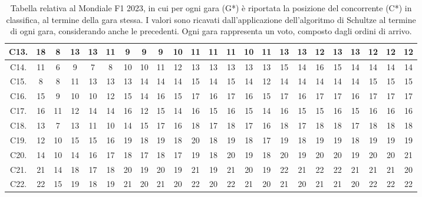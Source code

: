 \documentclass[12pt,a4paper,openright,twoside]{book}
\begin{document}
\begin{table}[H]
{\begin{tabular}{|c|c|c|c|c|c|c|c|c|c|c|c|c|c|c|c|c|c|c|c|c|c|c|}
C13.  & 18 & 8 & 13 & 13 & 11 & 9 & 9 & 9 & 10 & 11 & 11 & 11 & 10 & 11 & 13 & 13 & 12 & 13 & 13 & 12 & 12 & 12 \\ \hline
C14.  & 11 & 6 & 9 & 7 & 8 & 10 & 10 & 11 & 12 & 13 & 13 & 13 & 13 & 13 & 15 & 14 & 16 & 15 & 14 & 14 & 14 & 14 \\ \hline
C15. & 8 & 8 & 11 & 13 & 13 & 13 & 14 & 14 & 14 & 15 & 14 & 15 & 14 & 12 & 14 & 14 & 14 & 14 & 14 & 15 & 15 & 15 \\ \hline
C16.  & 15 & 9 & 10 & 10 & 12 & 15 & 14 & 16 & 15 & 17 & 16 & 17 & 16 & 15 & 17 & 16 & 17 & 17 & 16 & 17 & 17 & 17 \\ \hline
C17.  & 16 & 11 & 12 & 14 & 14 & 16 & 12 & 15 & 14 & 16 & 15 & 16 & 15 & 14 & 16 & 15 & 15 & 16 & 15 & 16 & 16 & 16 \\ \hline
C18.  & 13 & 7 & 13 & 11 & 10 & 14 & 15 & 17 & 16 & 18 & 17 & 18 & 17 & 16 & 18 & 17 & 18 & 18 & 17 & 18 & 18 & 18 \\ \hline
C19.  & 12 & 10 & 15 & 15 & 16 & 19 & 18 & 19 & 18 & 20 & 18 & 19 & 18 & 17 & 19 & 18 & 19 & 19 & 18 & 19 & 19 & 19 \\ \hline
C20.  & 14 & 10 & 14 & 16 & 17 & 18 & 17 & 18 & 17 & 19 & 18 & 20 & 19 & 18 & 20 & 19 & 20 & 20 & 19 & 20 & 20 & 21 \\ \hline
C21.  & 21 & 14 & 18 & 17 & 18 & 20 & 19 & 20 & 19 & 21 & 19 & 21 & 20 & 19 & 22 & 21 & 22 & 22 & 21 & 21 & 21 & 20 \\ \hline
C22.  & 22 & 15 & 19 & 18 & 19 & 21 & 20 & 21 & 20 & 22 & 20 & 22 & 21 & 20 & 21 & 20 & 21 & 21 & 20 & 22 & 22 & 22 \\ \hline
    \end{tabular}}
    \endgroup
    \caption{Tabella relativa al Mondiale F1 2023, in cui per ogni gara (G*)  è riportata la posizione del concorrente (C*) in classifica, al termine della gara stessa.
    I valori sono ricavati dall'applicazione dell'algoritmo di Schultze al termine di ogni gara, considerando anche le precedenti.
    Ogni gara rappresenta un voto, composto dagli ordini di arrivo.
    }
    \label{table:classifichegeneralischultze2023tabella}
\end{table}
\end{document}
